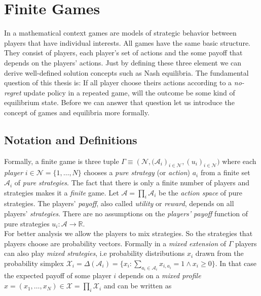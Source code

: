 
\chapter{Finite Games}\label{chapter:finiteGames}

In a mathematical context games are models of strategic behavior between players that have individual interests. All games have the same basic structure. They consist of players, each player's set of actions and the some payoff that depends on the players' actions. Just by defining these three element we can derive well-defined solution concepts such as Nash equilibria. The fundamental question of this thesis is: If all player choose theirs actions according to a \textit{no-regret} update policy in a repeated game, will the outcome be some kind of equilibrium state. Before we can answer that question let us introduce the concept of games and equilibria more formally.


\section{Notation and Definitions}\label{section:notationAndDefinitionsGames}

Formally, a finite game is three tuple $\Gamma \equiv (\mathcal{N}, {(\mathcal{A}_i})_{i\in\mathcal{N}},{(u_i)}_{i\in\mathcal{N}})$ where each \textit{player} $i \in \mathcal{N} = \{1,\dots,N\}$ chooses a \textit{pure strategy} (or \textit{action}) $a_i$ from a finite set $\mathcal{A}_i$ of \textit{pure strategies}. The fact that there is only a finite number of players and strategies makes it a \textit{finite} game. Let $\mathcal{A} = \prod_{i}\mathcal{A}_i$ be the \textit{action space} of pure strategies. The players' \textit{payoff}, also called \textit{utility} or \textit{reward}, depends on all players' \textit{strategies}. There are no assumptions on the \textit{players' payoff} function of pure strategies $u_i: \mathcal{A} \to \mathbb{R}$. \\

For better analysis we allow the players to mix strategies. So the strategies that players choose are probability vectors. Formally in a \textit{mixed extension} of $\Gamma$ players can also play \textit{mixed strategies}, i.e probability distributions $x_i$ drawn from the probability simplex $\mathcal{X}_i = \Delta(\mathcal{A}_i)  = \{x_i: \sum_{a_i\in \mathcal{A}_i}x_{i,a_i} = 1 \land x_i \ge 0\}$. In that case the expected payoff of some player $i$ depends on a \textit{mixed profile} $x = (x_1,\dots,x_N) \in \mathcal{X} = \prod_{i}\mathcal{X}_i$ and can be written as 

